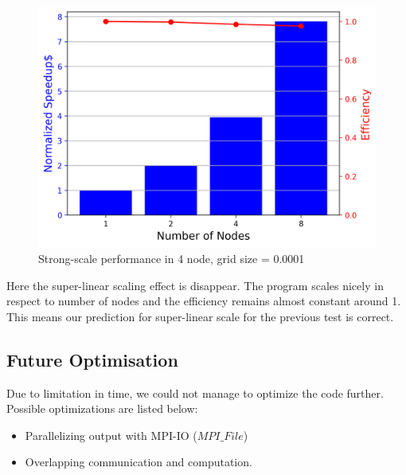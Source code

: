 \documentclass[article]{scrartcl}
\begin{document}
\begin{figure}[htpb]
  \centering
  \includegraphics[width=\textwidth,height=8cm,keepaspectratio=true]{../figs/5_strong_5.png}
  \caption{Strong-scale performance in 4 node, grid size = 0.0001}
  \label{fig:strong3}
\end{figure}
Here the super-linear scaling effect is disappear. The program scales nicely in respect to number of nodes and the efficiency remains almost constant around 1. This means our prediction for super-linear scale for the previous test is correct. 

\subsection{Future Optimisation}
Due to limitation in time, we could not manage to optimize the code further. Possible optimizations are listed below:  
\begin{itemize}
	\item Parallelizing output with MPI-IO ($MPI\_File$)
	\item Overlapping communication and computation.
\end{itemize}
\medskip
{}

\end{document}
